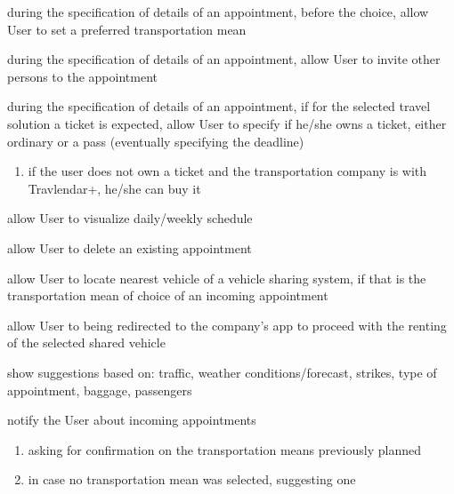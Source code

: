 \begin{enumerate}[label={[G\arabic*]}]
		\item \label{G_change_preferred_transp} during the specification of details of an appointment, before the choice, allow User to set a preferred transportation mean
		\item \label{G_invite} during the specification of details of an appointment, allow User to invite other persons to the appointment
		\item \label{G_owns_ticket} during the specification of details of an appointment, if for the selected travel solution a ticket is expected, allow User to specify if he/she owns a ticket, either ordinary or a pass (eventually specifying the deadline)
		\begin{enumerate}[label=\theenumi\#{\arabic*}]
			\item \label{G_buy_ticket} if the user does not own a ticket and the transportation company is  with Travlendar+, he/she can buy it
		\end{enumerate}
		\item \label{G_visualize_schedule} allow User to visualize daily/weekly schedule
		\item \label{G_delete} allow User to delete an existing appointment
		\item \label{G_locate} allow User to locate nearest vehicle of a vehicle sharing system, if that is the transportation mean of choice of an incoming appointment
		\item \label{G_redirection} allow User to being redirected to the company's app to proceed with the renting of the selected shared vehicle
		\item \label{G_show_suggestions} show suggestions based on: traffic, weather conditions/forecast, strikes, type of appointment, baggage, passengers
		\item \label{G_notify} notify the User about incoming appointments
		\begin{enumerate}[label=\theenumi\#{\arabic*}]
			\item \label{G_confirmation} asking for confirmation on the transportation means previously planned
			\item \label{G_notify_suggestions} in case no transportation mean was selected, suggesting one
		\end{enumerate}
	\end{enumerate}

